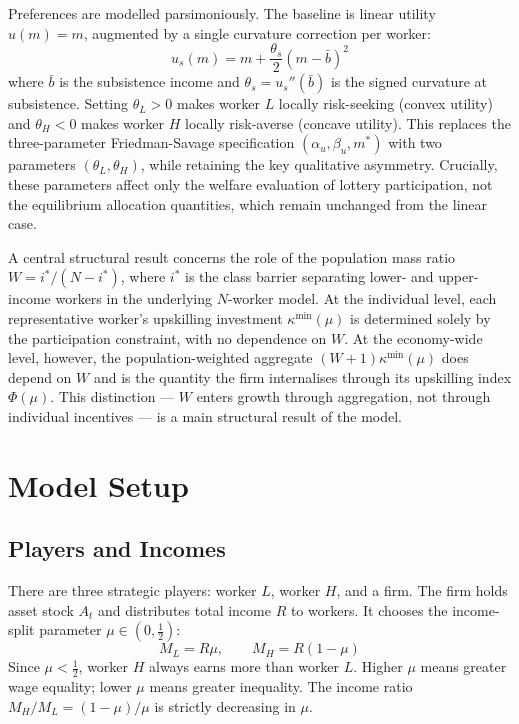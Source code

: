 \documentclass[12pt,a4paper]{article}
\begin{document}
Preferences are modelled parsimoniously. The baseline is linear utility
$u(m) = m$, augmented by a single curvature correction per worker:
\begin{equation}
  u_s(m) = m + \frac{\theta_s}{2}(m - \bar{b})^2
  \label{eq:utility_intro}
\end{equation}
where $\bar{b}$ is the subsistence income and $\theta_s = u_s''(\bar{b})$
is the signed curvature at subsistence. Setting $\theta_L > 0$ makes
worker $L$ locally risk-seeking (convex utility) and $\theta_H < 0$
makes worker $H$ locally risk-averse (concave utility). This replaces
the three-parameter Friedman-Savage specification $(\alpha_u, \beta_u,
m^*)$ with two parameters $(\theta_L, \theta_H)$, while retaining the
key qualitative asymmetry. Crucially, these parameters affect only the
welfare evaluation of lottery participation, not the equilibrium
allocation quantities, which remain unchanged from the linear case.

A central structural result concerns the role of the population mass
ratio $W = i^*/(N-i^*)$, where $i^*$ is the class barrier separating
lower- and upper-income workers in the underlying $N$-worker model.
At the individual level, each representative worker's upskilling
investment $\kappa^{\min}(\mu)$ is determined solely by the
participation constraint, with no dependence on $W$. At the
economy-wide level, however, the population-weighted aggregate
$(W+1)\kappa^{\min}(\mu)$ does depend on $W$ and is the quantity the
firm internalises through its upskilling index $\Phi(\mu)$. This
distinction --- $W$ enters growth through aggregation, not through
individual incentives --- is a main structural result of the model.

\section{Model Setup}

\subsection{Players and Incomes}

There are three strategic players: worker $L$, worker $H$, and a firm.
The firm holds asset stock $A_t$ and distributes total income $R$ to
workers. It chooses the income-split parameter $\mu \in (0, \tfrac{1}{2})$:
\begin{equation}
  M_L = R\mu, \qquad M_H = R(1-\mu)
  \label{eq:incomes}
\end{equation}
Since $\mu < \tfrac{1}{2}$, worker $H$ always earns more than worker
$L$. Higher $\mu$ means greater wage equality; lower $\mu$ means
greater inequality. The income ratio $M_H/M_L = (1-\mu)/\mu$ is
strictly decreasing in $\mu$.
\end{document}
